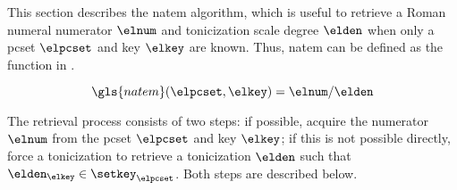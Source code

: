 
This section describes the \gls{natem} algorithm, which is
useful to retrieve a Roman numeral numerator $\elnum$ and
tonicization scale degree $\elden$ when only a \gls{pcset}
$\elpcset$ and key $\elkey$ are known. Thus, \gls{natem} can
be defined as the function in .

\begin{equation}
    \label{eq:natem}
    \gls{natem}(\elpcset, \elkey) = \elnum\text{/}\elden
\end{equation}

The retrieval process consists of two steps: if possible,
acquire the numerator $\elnum$ from the \gls{pcset}
$\elpcset$ and key $\elkey$; if this is not possible
directly, force a tonicization to retrieve a tonicization
$\elden$ such that $\elden_\elkey \in \setkey_\elpcset$.
Both steps are described below.


